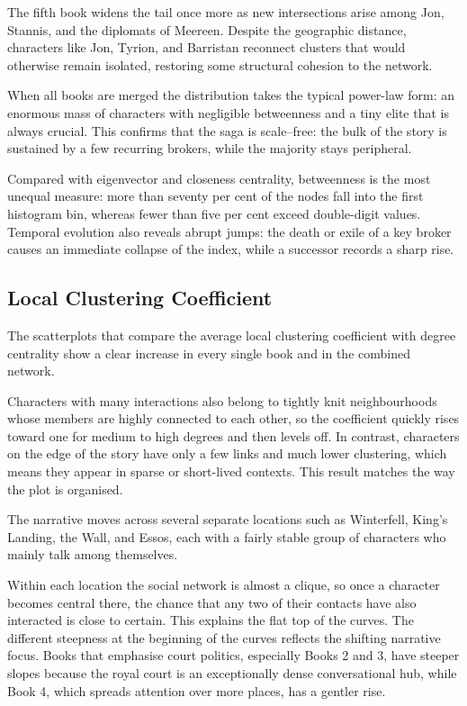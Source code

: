 \documentclass[12pt, a4paper]{article}
\begin{document}
The fifth book widens the tail once more as new intersections arise among Jon, Stannis, and the diplomats of Meereen. Despite the geographic distance, characters like Jon, Tyrion, and Barristan reconnect clusters that would otherwise remain isolated, restoring some structural cohesion to the network.

When all books are merged the distribution takes the typical power-law form: an enormous mass of characters with negligible betweenness and a tiny elite that is always crucial. This confirms that the saga is scale–free: the bulk of the story is sustained by a few recurring brokers, while the majority stays peripheral.

Compared with eigenvector and closeness centrality, betweenness is the most unequal measure: more than seventy per cent of the nodes fall into the first histogram bin, whereas fewer than five per cent exceed double-digit values. Temporal evolution also reveals abrupt jumps: the death or exile of a key broker causes an immediate collapse of the index, while a successor records a sharp rise.

\subsection*{Local Clustering Coefficient}
The scatterplots that compare the average local clustering coefficient 
with degree centrality show a clear increase in every single book and in the combined network.

Characters with many interactions also belong to tightly knit neighbourhoods whose members
 are highly connected to each other, so the coefficient quickly rises toward one for medium
 to high degrees and then levels off. In contrast, characters on the edge of the story 
 have only a few links and much lower clustering, which means they appear in sparse or 
 short-lived contexts. This result matches the way the plot is organised. 
 
 The narrative moves across several separate locations such as Winterfell, King's Landing, 
 the Wall, and Essos, each with a fairly stable group of characters who mainly talk among 
 themselves.
 
 Within each location the social network is almost a clique, 
 so once a character becomes central there, the chance that any 
 two of their contacts have also interacted is close to certain. 
 This explains the flat top of the curves.
   The different steepness at the beginning of the curves reflects the shifting narrative focus.
   Books that emphasise court politics, especially Books 2 and 3, 
   have steeper slopes because the royal court is an exceptionally 
   dense conversational hub, while Book 4, which spreads attention over more places, 
   has a gentler rise. 
   
\end{document}
